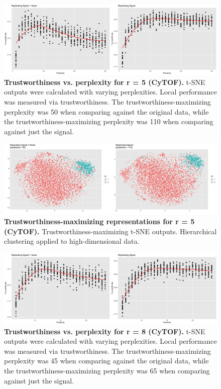 \documentclass{article}
\begin{document}
\begin{figure}[H]
\centering
\includegraphics[scale=0.85]{Fig S7}
\caption{{\bf Trustworthiness vs. perplexity for r = 5 (CyTOF).}
t-SNE outputs were calculated with varying perplexities. Local performance was measured via trustworthiness. The trustworthiness-maximizing perplexity was 50 when comparing against the original data, while the trustworthiness-maximizing perplexity was 110 when comparing against just the signal.}
\end{figure}

\begin{figure}[H]
\centering
\includegraphics[scale=0.7]{Fig S8}
\caption{{\bf Trustworthiness-maximizing representations for r = 5 (CyTOF).}
Trustworthiness-maximizing t-SNE outputs. Hierarchical clustering applied to high-dimensional data.}
\end{figure}

\begin{figure}[H]
\centering
\includegraphics[scale=0.85]{Fig S9}
\caption{{\bf Trustworthiness vs. perplexity for r = 8 (CyTOF).}
t-SNE outputs were calculated with varying perplexities. Local performance was measured via trustworthiness. The trustworthiness-maximizing perplexity was 45 when comparing against the original data, while the trustworthiness-maximizing perplexity was 65 when comparing against just the signal.}
\end{figure}
\end{document}
